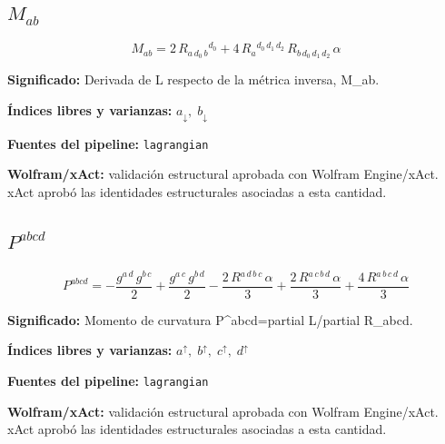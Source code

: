 \documentclass[11pt]{article}
\begin{document}
\subsection*{$ M_{ab} $}
\begin{dmath*}[breakdepth={5}]
M_{ab} = 2\,R{}_{a\,d_{0}\,b}{}^{d_{0}} + 4\,R{}_{a}{}^{d_{0}\,d_{1}\,d_{2}}\,R{}_{b\,d_{0}\,d_{1}\,d_{2}}\,\alpha
\end{dmath*}
\par\vspace{1.2\baselineskip}\noindent
\begin{minipage}{\linewidth}
\textbf{Significado:} Derivada de L respecto de la métrica inversa, M\_ab.\par
\textbf{Índices libres y varianzas:} $ a_{\downarrow},\;b_{\downarrow} $\par
\textbf{Fuentes del pipeline:} \texttt{lagrangian}\par
\textbf{Wolfram/xAct:} validación estructural aprobada con Wolfram Engine/xAct. xAct aprobó las identidades estructurales asociadas a esta cantidad.\par
\end{minipage}
\subsection*{$ P^{abcd} $}
\begin{dmath*}[breakdepth={5}]
P^{abcd} = -\frac{g{}^{a\,d}\,g{}^{b\,c}}{2} + \frac{g{}^{a\,c}\,g{}^{b\,d}}{2} - \frac{2\,R{}^{a\,d\,b\,c}\,\alpha}{3} + \frac{2\,R{}^{a\,c\,b\,d}\,\alpha}{3} + \frac{4\,R{}^{a\,b\,c\,d}\,\alpha}{3}
\end{dmath*}
\par\vspace{1.2\baselineskip}\noindent
\begin{minipage}{\linewidth}
\textbf{Significado:} Momento de curvatura P^{abcd}=partial L/partial R\_abcd.\par
\textbf{Índices libres y varianzas:} $ a^{\uparrow},\;b^{\uparrow},\;c^{\uparrow},\;d^{\uparrow} $\par
\textbf{Fuentes del pipeline:} \texttt{lagrangian}\par
\textbf{Wolfram/xAct:} validación estructural aprobada con Wolfram Engine/xAct. xAct aprobó las identidades estructurales asociadas a esta cantidad.\par
\end{minipage}
\end{document}
